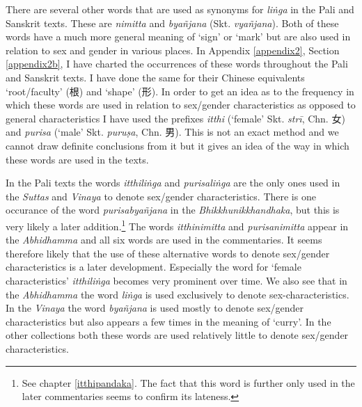 There are several other words that are used as synonyms for \textit{liṅga} in the Pali and Sanskrit texts. These are \textit{nimitta} and \textit{byañjana} (Skt. \textit{vyañjana}). Both of these words have a much more general meaning of `sign' or `mark' but are also used in relation to sex and gender in various places. In Appendix \ref{appendix2}, Section \ref{appendix2b}, I have charted the occurrences of these words throughout the Pali and Sanskrit texts. I have done the same for their Chinese equivalents `root/faculty' (根) and `shape' (形). In order to get an idea as to the frequency in which these words are used in relation to sex/gender characteristics as opposed to general characteristics I have used the prefixes \textit{itthi} (`female' Skt. \textit{strī}, Chn. 女) and \textit{purisa} (`male' Skt. \textit{puruṣa}, Chn. 男). This is not an exact method and we cannot draw definite conclusions from it but it gives an idea of the way in which these words are used in the texts.

In the Pali texts the words \textit{itthiliṅga} and \textit{purisaliṅga} are the only ones used in the \textit{Suttas} and \textit{Vinaya} to denote sex/gender characteristics. There is one occurance of the word \textit{purisabyañjana} in the \textit{Bhikkhunikkhandhaka}, but this is very likely a later addition.\footnote{See chapter \ref{itthipandaka}. The fact that this word is further only used in the later commentaries seems to confirm its lateness.}  The words \textit{itthinimitta} and \textit{purisanimitta} appear in the \textit{Abhidhamma} and all six words are used in the commentaries. It seems therefore likely that the use of these alternative words to denote sex/gender characteristics is a later development. Especially the word for `female characteristics' \textit{itthiliṅga} becomes very prominent over time. We also see that in the \textit{Abhidhamma} the word \textit{liṅga} is used exclusively to denote sex-characteristics. In the \textit{Vinaya} the word \textit{byañjana} is used mostly to denote sex/gender characteristics but also appears a few times in the meaning of `curry'. In the other collections both these words are used relatively little to denote sex/gender characteristics. 

